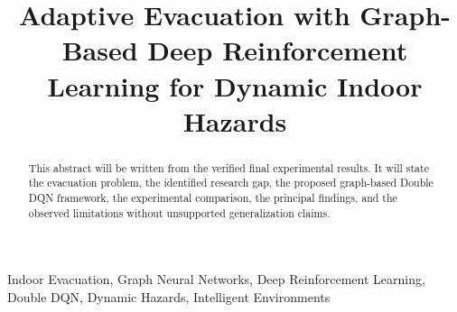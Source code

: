 \documentclass[conference]{IEEEtran}
\begin{document}
\title{Adaptive Evacuation with Graph-Based Deep Reinforcement Learning for Dynamic Indoor Hazards}

\author{
}

\maketitle

\begin{abstract}
This abstract will be written from the verified final experimental results. It will state the evacuation problem, the identified research gap, the proposed graph-based Double DQN framework, the experimental comparison, the principal findings, and the observed limitations without unsupported generalization claims.
\end{abstract}

\begin{IEEEkeywords}
Indoor Evacuation, Graph Neural Networks, Deep Reinforcement Learning, Double DQN, Dynamic Hazards, Intelligent Environments
\end{IEEEkeywords}










\end{document}
